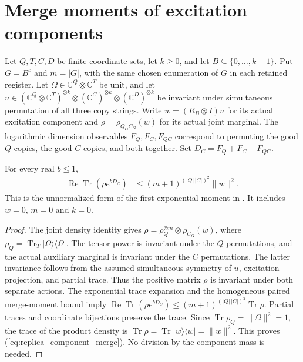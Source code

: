 \section{Merge moments of excitation components}
\label{sec:replica_component_merge_moment}

Let $Q,T,C,D$ be finite coordinate sets, let $k\geq0$, and let
$B\subseteq\{0,\ldots,k-1\}$. Put $G=B^c$ and $m=|G|$, with the same
chosen enumeration of $G$ in each retained register. Let
$\Omega\in\mathbb C^Q\otimes\mathbb C^T$ be unit, and let
$u\in(\mathbb C^Q\otimes\mathbb C^T)^{\otimes k}
\otimes(\mathbb C^C)^{\otimes k}\otimes(\mathbb C^D)^{\otimes k}$
be invariant under simultaneous permutation of all three copy strings.
Write $w=(R_B\otimes I)u$ for its actual excitation component and
$\rho=\rho_{Q_GC_G}(w)$ for its actual joint marginal.
The logarithmic dimension observables $F_Q,F_C,F_{QC}$ correspond to
permuting the good $Q$ copies, the good $C$ copies, and both together.
Set $D_C=F_Q+F_C-F_{QC}$.

\begin{theorem}
\label{thm:replica_component_merge_moment}
\leanok
{}
For every real $b\leq1$,
\begin{align}
 \operatorname{Re}\operatorname{Tr}(\rho e^{bD_C})
 &\leq (m+1)^{(|Q|\,|C|)^2}\|w\|^2.
 \label{eq:replica_component_merge}
\end{align}
This is the unnormalized form of the first exponential moment in
\cite[Section~7, equation \textup{(comparator:merge-moments)}]{OpenAI2026AreaLaw}.
It includes $w=0$, $m=0$ and $k=0$.
\end{theorem}

\begin{proof}
\leanok
{}
The joint density identity gives
$\rho=\rho_Q^{\otimes m}\otimes\rho_{C_G}(w)$, where
$\rho_Q=\operatorname{Tr}_T|\Omega\rangle\langle\Omega|$.
The tensor power is invariant under the $Q$ permutations, and the actual
auxiliary marginal is invariant under the $C$ permutations.
The latter invariance follows from the assumed simultaneous symmetry of
$u$, excitation projection, and partial trace.
Thus the positive matrix $\rho$ is invariant under both separate actions.
The exponential trace expansion and the homogeneous paired merge-moment
bound imply
$\operatorname{Re}\operatorname{Tr}(\rho e^{bD_C})
\leq(m+1)^{(|Q|\,|C|)^2}\operatorname{Tr}\rho$.
Partial traces and coordinate bijections preserve the trace. Since
$\operatorname{Tr}\rho_Q=\|\Omega\|^2=1$, the trace of the product density
is $\operatorname{Tr}\rho=\operatorname{Tr}|w\rangle\langle w|=\|w\|^2$.
This proves (\ref{eq:replica_component_merge}). No division by the component
mass is needed.
\end{proof}
